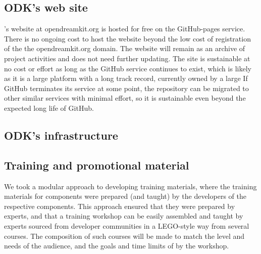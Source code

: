 \documentclass{deliverablereport}
\begin{document}
\subsection{ODK's web site}

\ODK's website at opendreamkit.org is hosted for free on the GitHub-pages service.
There is no ongoing cost to host the website beyond the low cost of registration of the the opendreamkit.org domain.
The \ODK website will remain as an archive of project activities and does not need further updating.
The site is sustainable at no cost or effort as long as the GitHub service continues to exist,
which is likely as it is a large platform with a long track record, currently owned by a large
If GitHub terminates its service at some point,
the repository can be migrated to other similar services with minimal effort,
so it is sustainable even beyond the expected long life of GitHub.


\subsection{ODK's infrastructure}


\subsection{Training and promotional material}


We took a modular approach to developing training materials,
where the training materials for \ODK components were prepared
(and taught) by the developers of the respective components.
This approach ensured that they were prepared by experts, and
that a training workshop can be easily assembled and taught by
experts sourced from developer communities in a LEGO-style way from several courses.
The composition of such courses will be made to
match the level and needs of the audience, and the goals and
time limits of by the workshop.
\end{document}

